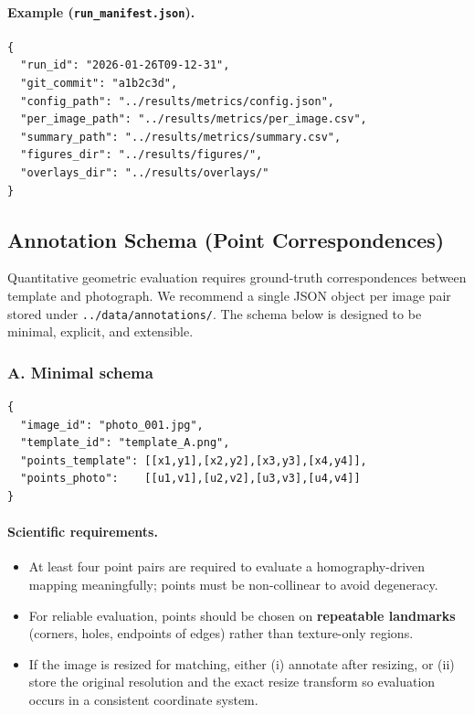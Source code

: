 \paragraph{Example (\texttt{run\_manifest.json}).}
\begin{verbatim}
{
  "run_id": "2026-01-26T09-12-31",
  "git_commit": "a1b2c3d",
  "config_path": "../results/metrics/config.json",
  "per_image_path": "../results/metrics/per_image.csv",
  "summary_path": "../results/metrics/summary.csv",
  "figures_dir": "../results/figures/",
  "overlays_dir": "../results/overlays/"
}
\end{verbatim}

\subsection{Annotation Schema (Point Correspondences)}
\label{subsec:appendix_annotation_schema}

Quantitative geometric evaluation requires ground-truth correspondences between template and photograph. We recommend a single JSON object per image pair stored under \texttt{../data/annotations/}. The schema below is designed to be minimal, explicit, and extensible.

\subsubsection*{A. Minimal schema}
\begin{verbatim}
{
  "image_id": "photo_001.jpg",
  "template_id": "template_A.png",
  "points_template": [[x1,y1],[x2,y2],[x3,y3],[x4,y4]],
  "points_photo":    [[u1,v1],[u2,v2],[u3,v3],[u4,v4]]
}
\end{verbatim}

\paragraph{Scientific requirements.}
\begin{itemize}
  \item At least four point pairs are required to evaluate a homography-driven mapping meaningfully; points must be non-collinear to avoid degeneracy.
  \item For reliable evaluation, points should be chosen on \textbf{repeatable landmarks} (corners, holes, endpoints of edges) rather than texture-only regions.
  \item If the image is resized for matching, either (i) annotate after resizing, or (ii) store the original resolution and the exact resize transform so evaluation occurs in a consistent coordinate system.
\end{itemize}

